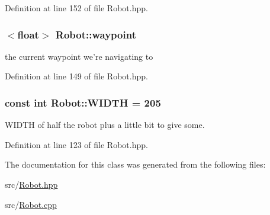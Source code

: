 Definition at line 152 of file Robot.\-hpp.

\hypertarget{classRobot_a4e7ca1c81831d252aa1545f549bff3f4}{
\subsubsection[{waypoint}]{$<$float$>$ Robot\-::waypoint\hspace{0.3cm}{\ttfamily [private]}}}\label{classRobot_a4e7ca1c81831d252aa1545f549bff3f4}


the current waypoint we're navigating to 



Definition at line 149 of file Robot.\-hpp.

\hypertarget{classRobot_aeefc61d76e6ba024e4af9c844715a84d}{
\subsubsection[{W\-I\-D\-T\-H}]{\setlength{\rightskip}{0pt plus 5cm}const int Robot\-::\-W\-I\-D\-T\-H = 205\hspace{0.3cm}{\ttfamily [static]}}}\label{classRobot_aeefc61d76e6ba024e4af9c844715a84d}


W\-I\-D\-T\-H of half the robot plus a little bit to give some. 



Definition at line 123 of file Robot.\-hpp.



The documentation for this class was generated from the following files\-:\begin{DoxyCompactItemize}
\item 
src/\hyperlink{Robot_8hpp}{Robot.\-hpp}\item 
src/\hyperlink{Robot_8cpp}{Robot.\-cpp}\end{DoxyCompactItemize}
